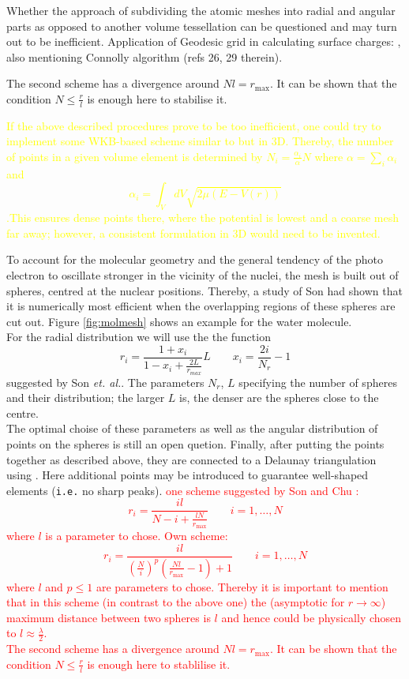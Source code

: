 Whether the approach of subdividing the atomic meshes into radial and angular parts as opposed to another volume tessellation can be questioned and 
may turn out to be inefficient.
Application of Geodesic grid in calculating surface charges: \cite{geodes_charge}, also mentioning Connolly algorithm (refs 26, 29 therein).

The second scheme has a divergence around $Nl=r_\text{max}$. 
It can be shown that the condition $N\leq \frac rl $ is enough here to stabilise it.

\textcolor{yellow}{
If the above described procedures prove to be too inefficient, one could try to implement some WKB-based scheme similar to \cite{impLDVR} but in 3D.
Thereby, the number of points in a given volume element is determined by $N_i=\frac{\alpha_i}{\alpha} N$ where $\alpha=\sum_i \alpha_i $ and
\[ \alpha_i= \int_V dV \sqrt{2\mu (E-V(r))} \]
.This ensures dense points there, where the potential is lowest and a coarse mesh far away; however, a consistent formulation in 3D would need to be invented.
}

To account for the molecular geometry and the general tendency of the photo electron to oscillate stronger in the vicinity of the nuclei, the mesh is built out of spheres, centred at the nuclear positions.
Thereby, a study of Son \cite{Son_Chu0} had shown that it is numerically most efficient when the overlapping regions of these spheres are cut out.
Figure \ref{fig:molmesh} shows an example for the water molecule.\\
For the radial distribution we will use the the function
\[
r_i = \frac{1+x_i}{1-x_i+\frac{2L}{r_{max}}} L \qquad x_i = \frac{2i}{N_r} -1
\]
suggested by Son \textit{et. al.}\cite{Son_Chu0, Son_Chu}.
The parameters $N_r$, $L$ specifying the number of spheres and their distribution; the larger $L$ is, the denser are the spheres close to the centre.\\
The optimal choise of these parameters as well as the angular distribution of points on the spheres is still an open quetion.
Finally, after putting the points together as described above, they are connected to a Delaunay triangulation using  \cite{tetgen}. 
Here additional points may be introduced to guarantee well-shaped elements (\texttt{i.e.} no sharp peaks).
\textcolor{red}{
one scheme suggested by Son and Chu \cite{Son_Chu0}:
\[ r_i=\frac{il}{N-i+\frac{lN}{r_\text{max}}} \qquad i=1,\hdots ,N \]
where $l$ is a parameter to chose.
Own scheme:
\[ r_i=\frac{il}{\left( \frac Ni \right)^p \left(\frac{Nl}{r_\text{max}}-1\right) +1} \qquad i=1,\hdots ,N \]
where $l$ and $p\leq 1$ are parameters to chose. Thereby it is important to mention that in this scheme (in contrast to the above one) the (asymptotic for $r\rightarrow \infty$) maximum distance between two spheres is $l$ and hence could be physically chosen to $l\approx \frac \lambda 2$.\\
The second scheme has a divergence around $Nl=r_\text{max}$. 
It can be shown that the condition $N\leq \frac rl $ is enough here to stablilise it. }

